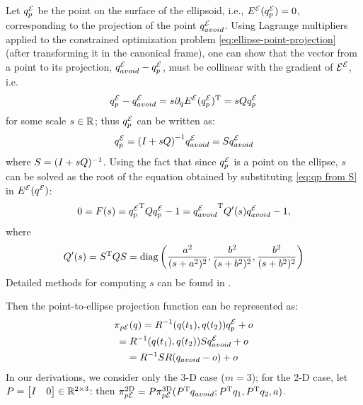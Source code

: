 \documentclass[journal]{IEEEtran}  %
\begin{document}
  Let $q^{\mathcal{E}}_p$ be the point on the surface of the ellipsoid, i.e., ${E^{\mathcal{E}}}(q^{\mathcal{E}}_p) = 0$, corresponding to the projection of the point $q^{\mathcal{E}}_{avoid}$. Using Lagrange multipliers applied to the constrained optimization problem \eqref{eq:ellipse-point-projection} (after transforming it in the canonical frame), one can show that the vector from a point to its projection, $q^{\mathcal{E}}_{avoid}- q^{\mathcal{E}}_p$, must be collinear with the gradient of ${\mathcal{E}^{\mathcal{E}}}$, i.e.
  \begin{equation}
    q^{\mathcal{E}}_p- q^{\mathcal{E}}_{avoid} = s \partial_q {E^{\mathcal{E}}}(q^{\mathcal{E}}_p)^\mathrm{T} = s Q q^{\mathcal{E}}_p
  \end{equation}
  for some scale $s\in\mathbb{R}^{}{}$;
  thus $q^{\mathcal{E}}_p$ can be written as:
  \begin{equation}\label{eq:qp from S}
    q^{\mathcal{E}}_{p} = {(I+sQ)}^{-1} q^{\mathcal{E}}_{avoid} = S q^{\mathcal{E}}_{avoid}
  \end{equation}
  where $S=(I+sQ)^{-1}$.
  Using the fact that since $q^{\mathcal{E}}_p$ is a point on the ellipse, $s$ can be solved as the root of the equation obtained by substituting \eqref{eq:qp from S} in ${E^{\mathcal{E}}}({q^{\mathcal{E}}})$:
  \begin{equation}
    0=F(s)={q^{\mathcal{E}}_p}^\mathrm{T} Q q^{\mathcal{E}}_p-1={q^{\mathcal{E}}_{avoid}}^\mathrm{T} Q'(s) q^{\mathcal{E}}_{avoid} -1,
  \end{equation}
  where
  \begin{equation}
    Q'(s) =S^\mathrm{T} Q S = \operatorname{diag}\left(\frac{a^{2}}{(s+a^{2})^2}, \frac{b^{2}}{(s+b^{2})^2},\frac{b^{2}}{(s+b^{2})^2}\right)
  \end{equation}
 Detailed methods for computing $s$ can be found in \cite{eberly}. 
 
  Then the point-to-ellipse projection function can be represented as:
  \begin{multline}\label{equ:Point2EllipseProjection}
    \pi_{p\mathcal{E}}(q)= R^{-1}(q(t_1),q(t_2))q^{\mathcal{E}}_p+o \\
    = R^{-1}(q(t_1),q(t_2))Sq^{\mathcal{E}}_{avoid}+o\\
    = R^{-1}S R ( q_{avoid}- o)+o
  \end{multline}
  In our derivations, we consider only the 3-D case ($m=3$); for the 2-D case, let $P=\begin{bmatrix}I & 0\end{bmatrix}\in\mathbb{R}^{2\times 3}{}$: then $\pi_{p\mathcal{E}}^{\textrm{2D}}=P\pi_{p\mathcal{E}}^{\textrm{3D}}(P^\mathrm{T} q_{avoid}; P^\mathrm{T} q_1, P^\mathrm{T} q_2,a)$.
\end{document}
